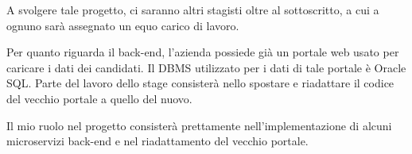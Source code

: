 A svolgere tale progetto, ci saranno altri stagisti oltre al sottoscritto, a cui a ognuno sarà assegnato un equo carico di lavoro.

Per quanto riguarda il back-end, l'azienda possiede già un portale web usato per caricare i dati dei candidati. Il DBMS utilizzato per i dati di tale portale è Oracle SQL.
Parte del lavoro dello stage consisterà nello spostare e riadattare il codice del vecchio portale a quello del nuovo.

Il mio ruolo nel progetto consisterà prettamente nell'implementazione di alcuni microservizi back-end e nel riadattamento del vecchio portale.
